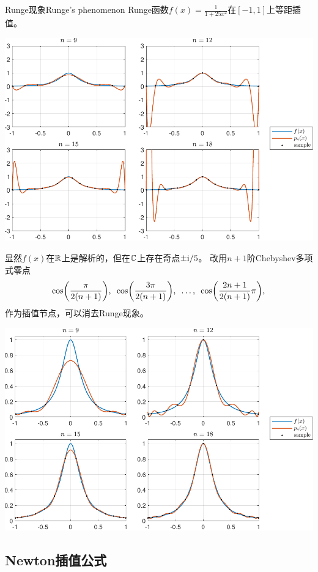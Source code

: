 \begin{example}
    {Runge现象}{Runge's phenomenon}
    Runge函数$f(x)=\frac1{1+25x^2}$在$[-1,1]$上等距插值。
    \begin{center}
        \includegraphics[width=0.9\linewidth]{graphs/Runge.pdf}
    \end{center}
    显然$f(x)$在$\mathbb R$上是解析的，但在$\mathbb C$上存在奇点$\pm\mathrm{i}/5$。
    \tcblower
    改用$n+1$阶Chebyshev多项式零点
    \[
        \cos\biggl(\frac{\pi}{2(n+1)}\biggr),\enspace
        \cos\biggl(\frac{3\pi}{2(n+1)}\biggr),\enspace
        \ldots,\enspace
        \cos\biggl(\frac{2n+1}{2(n+1)}\pi\biggr),
    \]
    作为插值节点，可以消去Runge现象。
    \begin{center}
        \includegraphics[width=0.9\linewidth]{graphs/Rungeless.pdf}
    \end{center}
\end{example}

\subsection{Newton插值公式}

